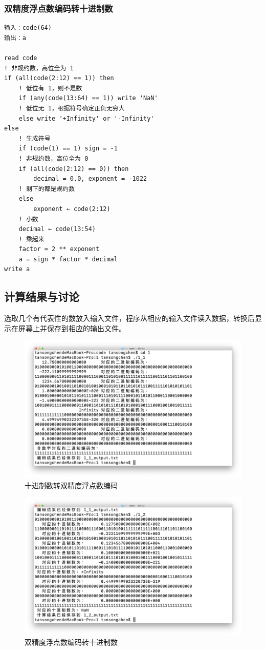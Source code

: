 \documentclass{ctexart}
\begin{document}
\subsubsection{双精度浮点数编码转十进制数}
\begin{lstlisting}
输入：code(64)
输出：a

read code
! 非规约数，高位全为 1
if (all(code(2:12) == 1)) then
    ! 低位有 1，则不是数
    if (any(code(13:64) == 1)) write 'NaN'
    ! 低位无 1，根据符号确定正负无穷大
    else write '+Infinity' or '-Infinity'
else
    ! 生成符号
    if (code(1) == 1) sign = -1
    ! 非规约数，高位全为 0
    if (all(code(2:12) == 0)) then
        decimal = 0.0, exponent = -1022
    ! 剩下的都是规约数
    else
        exponent ← code(2:12)
    ! 小数
    decimal ← code(13:54)
    ! 乘起来
    factor = 2 ** exponent
    a = sign * factor * decimal
write a
\end{lstlisting}
\subsection{计算结果与讨论}
选取几个有代表性的数放入输入文件，程序从相应的输入文件读入数据，转换后显示在屏幕上并保存到相应的输出文件。
\begin{figure}[h]
\centering
\includegraphics[scale = 0.3]{1.png}
\caption{十进制数转双精度浮点数编码}
\end{figure}
\begin{figure}[h]
\centering
\includegraphics[scale = 0.3]{2.png}
\caption{双精度浮点数编码转十进制数}
\end{figure}
\end{document}

